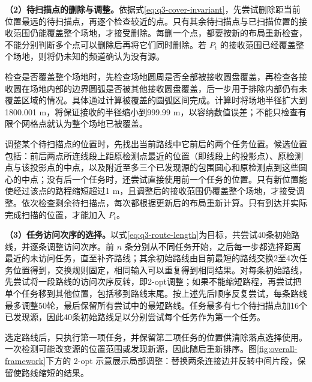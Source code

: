 \textbf{（2）待扫描点的删除与调整。}依据式\eqref{eq:q3-cover-invariant}，先尝试删除距当前位置最远的待扫描点，再逐个检查较近的点。只有其余待扫描点与已扫描位置的接收范围仍能覆盖整个场地，才接受删除。每删一个点，都要按新的布局重新检查，不能分别判断多个点可以删除后再将它们同时删除。若 $P_t$ 的接收范围已经覆盖整个场地，则将仍未知的频道确认为没有源。

检查是否覆盖整个场地时，先检查场地圆周是否全部被接收圆盘覆盖，再检查各接收圆在场地内部的边界圆弧是否被其他接收圆盘覆盖，后一步用于排除内部仍有未覆盖区域的情况。具体通过计算被覆盖的圆弧区间完成。计算时将场地半径扩大到1800.001 m，将保证接收的半径缩小到999.99 m，以容纳数值误差；不能只检查有限个网格点就认为整个场地已被覆盖。

调整某个待扫描点的位置时，先找出当前路线中它前后的两个任务位置。候选位置包括：前后两点所连线段上距原检测点最近的位置（即线段上的投影点）、原检测点与该投影点的中点，以及附近至多三个已发现源的包围圆心和原检测点到这些圆心的中点；没有后一个任务时，还尝试直接使用前一个任务的位置。只有新位置能使经过该点的路程缩短超过1 m，且调整后的接收范围仍覆盖整个场地，才接受调整。依次检查剩余待扫描点，每次都根据更新后的布局重新计算。只有到达并实际完成扫描的位置，才能加入 $P_t$。

\textbf{（3）任务访问次序的选择。}以式\eqref{eq:q3-route-length}为目标，共尝试40条初始路线，并逐条调整访问次序。前 $n$ 条分别从不同任务开始，之后每一步都选择距离最近的未访问任务，直至补齐路线；其余初始路线由目前最短的路线交换2至4次任务位置得到，交换规则固定，相同输入可以重复得到相同结果。对每条初始路线，先尝试将一段路线的访问次序反转，即2-opt调整；如果不能缩短路程，再尝试把单个任务移到其他位置，包括移到路线末尾。按上述先后顺序反复尝试，每条路线最多调整50轮，最后保留所有尝试中的最短路线。任务最多有七个待扫描点加16个已发现源，因此40条初始路线足以分别尝试每个任务作为第一个任务。

选定路线后，只执行第一项任务，并保留第二项任务的位置供清除落点选择使用。一次检测可能改变源的位置范围或发现新源，因此随后重新排序。图\ref{fig:overall-framework}下方的 2-opt 示意展示局部调整：替换两条连接边并反转中间片段，保留使路线缩短的结果。




